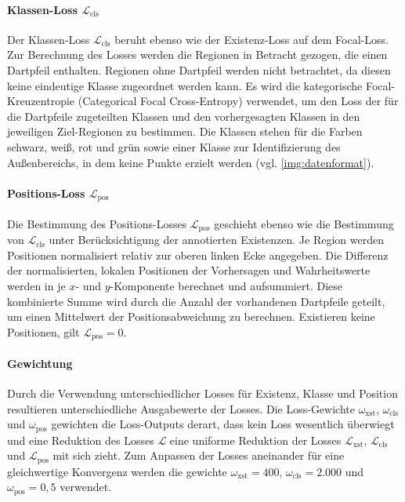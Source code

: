 \vspace*{-0.1cm}
\paragraph{Klassen-Loss $\mathcal{L}_\text{cls}$}

Der Klassen-Loss $\mathcal{L}_\text{cls}$ beruht ebenso wie der Existenz-Loss auf dem Focal-Loss. Zur Berechnung des Losses werden die Regionen in Betracht gezogen, die einen Dartpfeil enthalten. Regionen ohne Dartpfeil werden nicht betrachtet, da diesen keine eindeutige Klasse zugeordnet werden kann. Es wird die kategorische Focal-Kreuzentropie (Categorical Focal Cross-Entropy) \cite{focal_loss} verwendet, um den Loss der für die Dartpfeile zugeteilten Klassen und den vorhergesagten Klassen in den jeweiligen Ziel-Regionen zu bestimmen. Die Klassen stehen für die Farben schwarz, weiß, rot und grün sowie einer Klasse zur Identifizierung des Außenbereichs, in dem keine Punkte erzielt werden (vgl. \autoref{img:datenformat}).

\paragraph{Positions-Loss $\mathcal{L}_\text{pos}$}

Die Bestimmung des Positions-Losses $\mathcal{L}_\text{pos}$ geschieht ebenso wie die Bestimmung von $\mathcal{L}_\text{cls}$ unter Berücksichtigung der annotierten Existenzen. Je Region werden Positionen normalisiert relativ zur oberen linken Ecke angegeben. Die Differenz der normalisierten, lokalen Positionen der Vorhersagen und Wahrheitswerte werden in je $x$- und $y$-Komponente berechnet und aufsummiert. Diese kombinierte Summe wird durch die Anzahl der vorhandenen Dartpfeile geteilt, um einen Mittelwert der Positionsabweichung zu berechnen. Existieren keine Positionen, gilt $\mathcal{L}_\text{pos} = 0$.

\paragraph{Gewichtung}

Durch die Verwendung unterschiedlicher Losses für Existenz, Klasse und Position resultieren unterschiedliche Ausgabewerte der Losses. Die Loss-Gewichte $\omega_\text{xst}$, $\omega_\text{cls}$ und $\omega_\text{pos}$ gewichten die Loss-Outputs derart, dass kein Loss wesentlich überwiegt und eine Reduktion des Losses $\mathcal{L}$ eine uniforme Reduktion der Losses $\mathcal{L}_\text{xst}$, $\mathcal{L}_\text{cls}$ und $\mathcal{L}_\text{pos}$ mit sich zieht. Zum Anpassen der Losses aneinander für eine gleichwertige Konvergenz werden die gewichte $\omega_\text{xst} = 400$, $\omega_\text{cls} = 2.000$ und $\omega_\text{pos} = 0,\!5$ verwendet.

